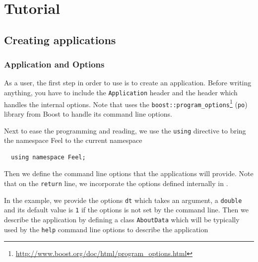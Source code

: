 \chapter{Tutorial}
\label{sec:tutorial}


\section{Creating applications}
\label{sec:creat-appl}



\subsection{Application and Options}
\label{sec:options}

As a \feel user, the first step in order to use \feel is to create an
application. Before writing anything, you have to include the \lstinline!Application! header and the header which handles the internal \feel options.
Note that \feel uses the \lstinline!boost::program_options!\footnote{\url{http://www.boost.org/doc/html/program_options.html}} (\verb|po|)
library from Boost to handle its command line options.



Next to ease the programming and reading, we use the \lstinline!using!
\cpp directive to bring the namespace Feel to the current namespace

\begin{lstlisting}
  using namespace Feel;
\end{lstlisting}

Then we define the command line options that the applications will
provide. Note that on the \lstinline!return! line, we incorporate the
options defined internally in \feel.



In the example, we provide the options \lstinline!dt! which takes an
argument, a \lstinline!double! and its default value is \lstinline!1!
if the options is not set by the command line. Then we describe the application by defining a class
\lstinline!AboutData! which will be typically used by the
\lstinline!help! command line options to describe the application





